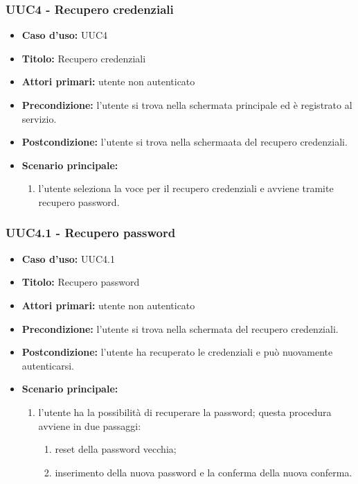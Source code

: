 \documentclass[casi-duso]{subfiles}
\begin{document}
\subsubsection{UUC4 - Recupero credenziali}
\label{subsub:UUC4utente}
\begin{itemize}
  \item \textbf{Caso d’uso:} UUC4 
  \item \textbf{Titolo:} Recupero credenziali
  \item \textbf{Attori primari:} utente non autenticato
  \item \textbf{Precondizione:} l'utente si trova nella schermata principale ed è registrato al servizio.
  \item \textbf{Postcondizione:} l'utente si trova nella schermaata del recupero credenziali.
  \item \textbf{Scenario principale:} 
  \begin{enumerate}
    \item l'utente seleziona la voce per il recupero credenziali e avviene tramite recupero password.
  \end{enumerate} 
\end{itemize}

\subsubsection{UUC4.1 - Recupero password}
\label{subsub:UUC4.1utente}
\begin{itemize}
  \item \textbf{Caso d’uso:} UUC4.1 
  \item \textbf{Titolo:} Recupero password
  \item \textbf{Attori primari:} utente non autenticato
  \item \textbf{Precondizione:} l'utente si trova nella schermata del recupero credenziali.
  \item \textbf{Postcondizione:} l'utente ha recuperato le credenziali e può nuovamente autenticarsi.
  \item \textbf{Scenario principale:} 
  \begin{enumerate}
    \item l'utente ha la possibilità di recuperare la password; questa procedura avviene in due passaggi:
    \begin{enumerate}
      \item reset della password vecchia;
      \item inserimento della nuova password e la conferma della nuova conferma.
    \end{enumerate}
  \end{enumerate} 
\end{itemize}
\end{document}
